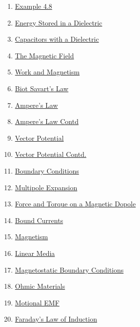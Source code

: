 \documentclass[11pt]{article}
\begin{document}
\begin{multicols}{2}
\begin{enumerate}
		\item \href{https://mp.weixin.qq.com/s/wSdVXavhOpC6igUPJ6lz-g}{Example 4.8}	%
		\item \href{https://mp.weixin.qq.com/s/TnWUE_CtX35mGtTCHq4wNg}{Energy Stored in a Dielectric}	%
		\item \href{https://mp.weixin.qq.com/s/MIAaq2y8cYh2GhArQhnImg}{Capacitors with a Dielectric}	%
		\item \href{https://mp.weixin.qq.com/s/o0XwIwVcUIypTJrVUC-daA}{The Magnetic Field}	%
		\item \href{https://mp.weixin.qq.com/s/gRBm-XXYQywdm3MWnP2cqA}{Work and Magnetism}	%
		\item \href{https://mp.weixin.qq.com/s/IN5n2jRDTn3oWZK38Fteeg}{Biot Savart's Law}	%
		\item \href{https://mp.weixin.qq.com/s/Wahi-QDDHN7_c4ehBQgGqQ}{Ampere's Law}	%
		\item \href{https://mp.weixin.qq.com/s/v17cEHZ26zchrRyBeakK0g}{Ampere's Law Contd}	%
		\item \href{https://mp.weixin.qq.com/s/srfFATSjsFghDBW4ezv9xQ}{Vector Potential}	%
		\item \href{https://mp.weixin.qq.com/s/kWHNAoG7vjjjb2R5nEQY2g}{Vector Potential Contd.}	%
		\item \href{https://mp.weixin.qq.com/s/gtwOe-Ajy9yU6L5m1JyhxQ}{Boundary Conditions}	%
		\item \href{https://mp.weixin.qq.com/s/qit4df8vgEP9HRFc9WZjXw}{Multipole Expansion}	%
		\item \href{https://mp.weixin.qq.com/s/H9HBpwtVKXTCZTkurWBaYw}{Force and Torque on a Magnetic Dopole}	%
		\item \href{https://mp.weixin.qq.com/s/YVwkVUrKr7KnZ7-SskMi7g}{Bound Currents}	%
		\item \href{https://mp.weixin.qq.com/s/d6FgMKvJBuB8fBc40mGcMQ}{Magnetism}	%
		\item \href{https://mp.weixin.qq.com/s/YVlIf2robqeL1i-2FYpRHg}{Linear Media}	%
		\item \href{https://mp.weixin.qq.com/s/WgwRuKMZDht3xve1Movi-g}{Magnetostatic Boundary Conditions}	%
		\item \href{https://mp.weixin.qq.com/s/THgEKxtfc1UZZvvfM9wKzg}{Ohmic Materials}	%
		\item \href{https://mp.weixin.qq.com/s/XzQ7ZVXA_ZEqYiJW6yE5uw}{Motional EMF}	%
		\item \href{https://mp.weixin.qq.com/s/KTbE7U9mvVpFYAhcYPbQhA}{Faraday's Law of Induction}	%

\end{enumerate}
\end{multicols}
\end{document}
